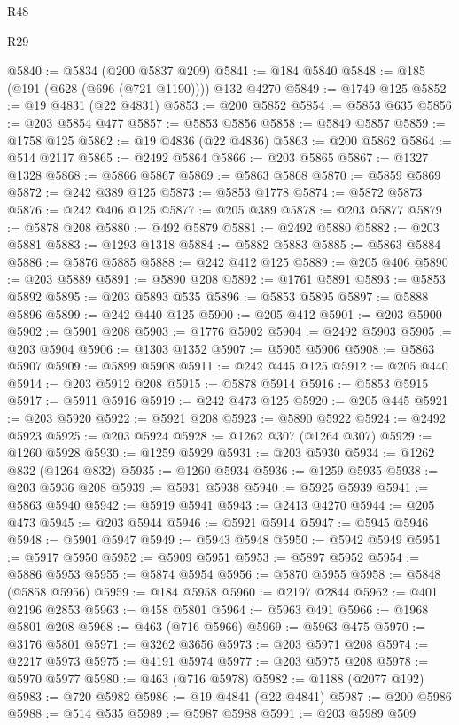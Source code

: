 \begin{lexlean}{R48}
\begin{lexlean}{R29}
\begin{coremodule}
{{{{{{{{{{{{{{{{{{{{{{{{{{{{{{{{{{{{{{{{{{{{{{{{{{{{{{{{{{{{{{{{{{{{{{{{{{{{{{{{{{{{{{{{{{{{{{{{{{{{{{{{{{{{{{{{{{{{{{{{{{{{{{{{{{{{{{{{{{{{{{{{{{{{{{{{{{{{{{{{{{{{{{{{{{{{{{{{{{{{{{{{{{{{{{{{{{{{{{{{{{{{{{{{{{{{{{{{{{@5840 := @5834 (@200 @5837 @209)
@5841 := @184 @5840
@5848 := @185 (@191 (@628 (@696 (@721 @1190)))) @132 @4270
@5849 := @1749 @125
@5852 := @19 @4831 (@22 @4831)
@5853 := @200 @5852
@5854 := @5853 @635
@5856 := @203 @5854 @477
@5857 := @5853 @5856
@5858 := @5849 @5857
@5859 := @1758 @125
@5862 := @19 @4836 (@22 @4836)
@5863 := @200 @5862
@5864 := @514 @2117
@5865 := @2492 @5864
@5866 := @203 @5865
@5867 := @1327 @1328
@5868 := @5866 @5867
@5869 := @5863 @5868
@5870 := @5859 @5869
@5872 := @242 @389 @125
@5873 := @5853 @1778
@5874 := @5872 @5873
@5876 := @242 @406 @125
@5877 := @205 @389
@5878 := @203 @5877
@5879 := @5878 @208
@5880 := @492 @5879
@5881 := @2492 @5880
@5882 := @203 @5881
@5883 := @1293 @1318
@5884 := @5882 @5883
@5885 := @5863 @5884
@5886 := @5876 @5885
@5888 := @242 @412 @125
@5889 := @205 @406
@5890 := @203 @5889
@5891 := @5890 @208
@5892 := @1761 @5891
@5893 := @5853 @5892
@5895 := @203 @5893 @535
@5896 := @5853 @5895
@5897 := @5888 @5896
@5899 := @242 @440 @125
@5900 := @205 @412
@5901 := @203 @5900
@5902 := @5901 @208
@5903 := @1776 @5902
@5904 := @2492 @5903
@5905 := @203 @5904
@5906 := @1303 @1352
@5907 := @5905 @5906
@5908 := @5863 @5907
@5909 := @5899 @5908
@5911 := @242 @445 @125
@5912 := @205 @440
@5914 := @203 @5912 @208
@5915 := @5878 @5914
@5916 := @5853 @5915
@5917 := @5911 @5916
@5919 := @242 @473 @125
@5920 := @205 @445
@5921 := @203 @5920
@5922 := @5921 @208
@5923 := @5890 @5922
@5924 := @2492 @5923
@5925 := @203 @5924
@5928 := @1262 @307 (@1264 @307)
@5929 := @1260 @5928
@5930 := @1259 @5929
@5931 := @203 @5930
@5934 := @1262 @832 (@1264 @832)
@5935 := @1260 @5934
@5936 := @1259 @5935
@5938 := @203 @5936 @208
@5939 := @5931 @5938
@5940 := @5925 @5939
@5941 := @5863 @5940
@5942 := @5919 @5941
@5943 := @2413 @4270
@5944 := @205 @473
@5945 := @203 @5944
@5946 := @5921 @5914
@5947 := @5945 @5946
@5948 := @5901 @5947
@5949 := @5943 @5948
@5950 := @5942 @5949
@5951 := @5917 @5950
@5952 := @5909 @5951
@5953 := @5897 @5952
@5954 := @5886 @5953
@5955 := @5874 @5954
@5956 := @5870 @5955
@5958 := @5848 (@5858 @5956)
@5959 := @184 @5958
@5960 := @2197 @2844
@5962 := @401 @2196 @2853
@5963 := @458 @5801
@5964 := @5963 @491
@5966 := @1968 @5801 @208
@5968 := @463 (@716 @5966)
@5969 := @5963 @475
@5970 := @3176 @5801
@5971 := @3262 @3656
@5973 := @203 @5971 @208
@5974 := @2217 @5973
@5975 := @4191 @5974
@5977 := @203 @5975 @208
@5978 := @5970 @5977
@5980 := @463 (@716 @5978)
@5982 := @1188 (@2077 @192)
@5983 := @720 @5982
@5986 := @19 @4841 (@22 @4841)
@5987 := @200 @5986
@5988 := @514 @535
@5989 := @5987 @5988
@5991 := @203 @5989 @509
}}}}}}}}}}}}}}}}}}}}}}}}}}}}}}}}}}}}}}}}}}}}}}}}}}}}}}}}}}}}}}}}}}}}}}}}}}}}}}}}}}}}}}}}}}}}}}}}}}}}}}}}}}}}}}}}}}}}}}}}}}}}}}}}}}}}}}}}}}}}}}}}}}}}}}}}}}}}}}}}}}}}}}}}}}}}}}}}}}}}}}}}}}}}}}}}}}}}}}}}}}}}}}}}}}}}}}}}}}
\end{coremodule}
\end{lexlean}
\end{lexlean}
